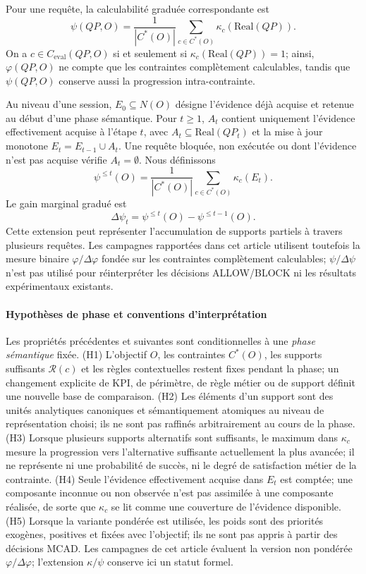 \documentclass[journal]{IEEEtran}
\begin{document}
Pour une requête, la calculabilité graduée correspondante est
\[
\psi(QP,O)=\frac{1}{|C^*(O)|}\sum_{c\in C^*(O)}\kappa_c(\mathrm{Real}(QP)).
\]
On a $c\in C_{\mathrm{eval}}(QP,O)$ si et seulement si $\kappa_c(\mathrm{Real}(QP))=1$; ainsi, $\varphi(QP,O)$ ne compte que les contraintes complètement calculables, tandis que $\psi(QP,O)$ conserve aussi la progression intra-contrainte.

Au niveau d'une session, $E_0\subseteq N(O)$ désigne l'évidence déjà acquise et retenue au début d'une phase sémantique. Pour $t\ge1$, $A_t$ contient uniquement l'évidence effectivement acquise à l'étape $t$, avec $A_t\subseteq\mathrm{Real}(QP_t)$ et la mise à jour monotone $E_t=E_{t-1}\cup A_t$. Une requête bloquée, non exécutée ou dont l'évidence n'est pas acquise vérifie $A_t=\emptyset$. Nous définissons
\[
\psi^{\le t}(O)=\frac{1}{|C^*(O)|}\sum_{c\in C^*(O)}\kappa_c(E_t).
\]
Le gain marginal gradué est
\[
\Delta\psi_t=\psi^{\le t}(O)-\psi^{\le t-1}(O).
\]
Cette extension peut représenter l'accumulation de supports partiels à travers plusieurs requêtes. Les campagnes rapportées dans cet article utilisent toutefois la mesure binaire $\varphi/\Delta\varphi$ fondée sur les contraintes complètement calculables; $\psi/\Delta\psi$ n'est pas utilisé pour réinterpréter les décisions ALLOW/BLOCK ni les résultats expérimentaux existants.

\paragraph*{Hypothèses de phase et conventions d'interprétation}
Les propriétés précédentes et suivantes sont conditionnelles à une \emph{phase sémantique} fixée. (H1) L'objectif $O$, les contraintes $C^*(O)$, les supports suffisants $\mathcal{R}(c)$ et les règles contextuelles restent fixes pendant la phase; un changement explicite de KPI, de périmètre, de règle métier ou de support définit une nouvelle base de comparaison. (H2) Les éléments d'un support sont des unités analytiques canoniques et sémantiquement atomiques au niveau de représentation choisi; ils ne sont pas raffinés arbitrairement au cours de la phase. (H3) Lorsque plusieurs supports alternatifs sont suffisants, le maximum dans $\kappa_c$ mesure la progression vers l'alternative suffisante actuellement la plus avancée; il ne représente ni une probabilité de succès, ni le degré de satisfaction métier de la contrainte. (H4) Seule l'évidence effectivement acquise dans $E_t$ est comptée; une composante inconnue ou non observée n'est pas assimilée à une composante réalisée, de sorte que $\kappa_c$ se lit comme une couverture de l'évidence disponible. (H5) Lorsque la variante pondérée est utilisée, les poids sont des priorités exogènes, positives et fixées avec l'objectif; ils ne sont pas appris à partir des décisions MCAD. Les campagnes de cet article évaluent la version non pondérée $\varphi/\Delta\varphi$; l'extension $\kappa/\psi$ conserve ici un statut formel.
\end{document}
